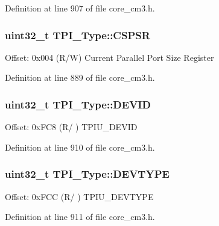 Definition at line 907 of file core\+\_\+cm3.\+h.

\subsubsection[{\texorpdfstring{C\+S\+P\+SR}{CSPSR}}]{ uint32\+\_\+t T\+P\+I\+\_\+\+Type\+::\+C\+S\+P\+SR}\hypertarget{structTPI__Type_aa723ef3d38237aa2465779b3cc73a94a}{}\label{structTPI__Type_aa723ef3d38237aa2465779b3cc73a94a}
Offset\+: 0x004 (R/W) Current Parallel Port Size Register 

Definition at line 889 of file core\+\_\+cm3.\+h.

\subsubsection[{\texorpdfstring{D\+E\+V\+ID}{DEVID}}]{ uint32\+\_\+t T\+P\+I\+\_\+\+Type\+::\+D\+E\+V\+ID}\hypertarget{structTPI__Type_a4b2e0d680cf7e26728ca8966363a938d}{}\label{structTPI__Type_a4b2e0d680cf7e26728ca8966363a938d}
Offset\+: 0x\+F\+C8 (R/ ) T\+P\+I\+U\+\_\+\+D\+E\+V\+ID 

Definition at line 910 of file core\+\_\+cm3.\+h.

\subsubsection[{\texorpdfstring{D\+E\+V\+T\+Y\+PE}{DEVTYPE}}]{ uint32\+\_\+t T\+P\+I\+\_\+\+Type\+::\+D\+E\+V\+T\+Y\+PE}\hypertarget{structTPI__Type_a16d12c5b1e12f764fa3ec4a51c5f0f35}{}\label{structTPI__Type_a16d12c5b1e12f764fa3ec4a51c5f0f35}
Offset\+: 0x\+F\+CC (R/ ) T\+P\+I\+U\+\_\+\+D\+E\+V\+T\+Y\+PE 

Definition at line 911 of file core\+\_\+cm3.\+h.

